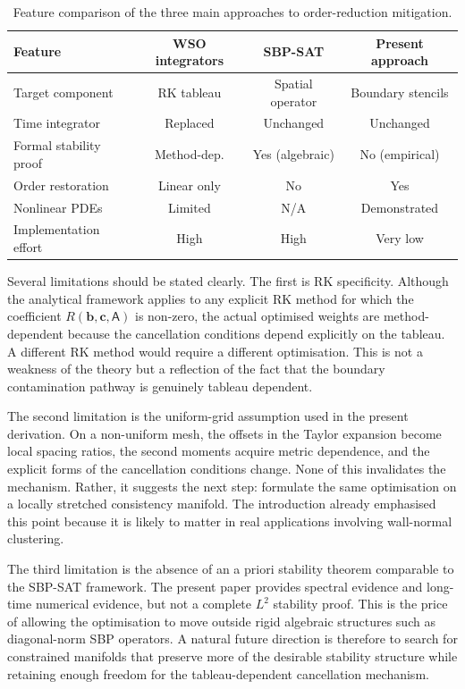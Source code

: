 \documentclass[review,hidelinks,onefignum,onetabnum]{siamart251216}
\begin{document}
\begin{table}[tbhp]
\centering
\caption{Feature comparison of the three main approaches to order-reduction mitigation.}
\label{tab:comparison}
\begin{tabular}{lccc}
\toprule
\textbf{Feature} & \textbf{WSO integrators} & \textbf{SBP-SAT} & \textbf{Present approach} \\
\midrule
Target component        & RK tableau      & Spatial operator       & Boundary stencils \\
Time integrator         & Replaced        & Unchanged              & Unchanged \\
Formal stability proof  & Method-dep.     & Yes (algebraic)        & No (empirical) \\
Order restoration       & Linear only     & No                     & Yes \\
Nonlinear PDEs          & Limited         & N/A                    & Demonstrated \\
Implementation effort   & High            & High                   & Very low \\
\bottomrule
\end{tabular}
\end{table}

Several limitations should be stated clearly. The first is RK specificity. Although the analytical framework applies to any explicit RK method for which the coefficient $R(\mathbf b,\mathbf c,\mathsf A)$ is non-zero, the actual optimised weights are method-dependent because the cancellation conditions depend explicitly on the tableau. A different RK method would require a different optimisation. This is not a weakness of the theory but a reflection of the fact that the boundary contamination pathway is genuinely tableau dependent.

The second limitation is the uniform-grid assumption used in the present derivation. On a non-uniform mesh, the offsets in the Taylor expansion become local spacing ratios, the second moments acquire metric dependence, and the explicit forms of the cancellation conditions change. None of this invalidates the mechanism. Rather, it suggests the next step: formulate the same optimisation on a locally stretched consistency manifold. The introduction already emphasised this point because it is likely to matter in real applications involving wall-normal clustering.

The third limitation is the absence of an a priori stability theorem comparable to the SBP-SAT framework. The present paper provides spectral evidence and long-time numerical evidence, but not a complete $L^2$ stability proof. This is the price of allowing the optimisation to move outside rigid algebraic structures such as diagonal-norm SBP operators. A natural future direction is therefore to search for constrained manifolds that preserve more of the desirable stability structure while retaining enough freedom for the tableau-dependent cancellation mechanism.
\end{document}
